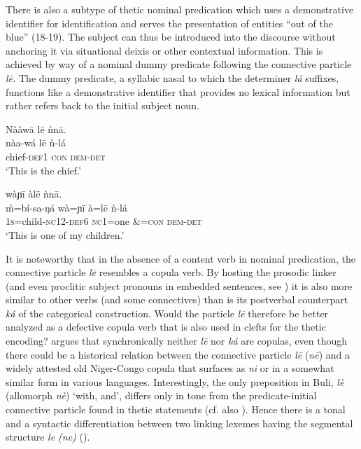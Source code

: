 \documentclass[output=paper]{langsci/langscibook}
\begin{document}
There is also a subtype of thetic nominal predication which uses a demonstrative identifier for identification and serves the presentation of entities “out of the blue” (18-19). The subject can thus be introduced into the discourse without anchoring it via situational deixis or other contextual information. This is achieved by way of a nominal dummy predicate following the connective particle \textit{l\={e}.} The dummy predicate, a syllabic nasal to which the determiner \textit{lá} suffixes, functions like a demonstrative identifier that provides no lexical information but rather refers back to the initial subject noun.

\ea\label{ex:schwarz:18}
\glll   Nààw\={a}    l\={e}  ǹn\={a}.\\
    \textup{nàa-wá}    l\={e}  {ǹ-lá}\\
       chief-\textsc{def1}  \textsc{con}  \textsc{dem}-\textsc{det}\\
\glt ‘This is the chief.’
\z

\ea\label{ex:schwarz:19}
    wàɲ\={i}    àl\={e}    ǹn\={a}.\\
    \textup{\`{m}=bí-sa-ŋá}    wà=ɲ\={i}    à=l\={e}    {ǹ-lá}\\
       1\textsc{s}=child-\textsc{nc}12-\textsc{def}6  \textsc{nc}1=one  \&=\textsc{con}  \textsc{dem-det}\\
\glt ‘This is one of my children.’
\z

It is noteworthy that in the absence of a content verb in nominal predication, the connective particle \textit{l\={e}} resembles a copula verb. By hosting the prosodic linker (and even proclitic subject pronouns in embedded sentences, see ) it is also more similar to other verbs (and some connectives) than is its postverbal counterpart \textit{ká} of the categorical construction. Would the particle \textit{l\={e}} therefore be better analyzed as a defective copula verb that is also used in clefts for the thetic encoding? \citet{Schwarz2009} argues that synchronically neither \textit{l\={e}} nor \textit{ká} are copulas, even though there could be a historical relation between the connective particle \textit{l\={e}} (\textit{n\={e}}) and a widely attested old Niger-Congo copula that surfaces as \textit{ni} or in a somewhat similar form in various languages. Interestingly, the only preposition in Buli, \textit{lè} (allomorph \textit{nè}) ‘with, and’, differs only in tone from the predicate-initial connective particle found in thetic statements (cf. also \citealt{Schwarz2010a}). Hence there is a tonal and a syntactic differentiation between two linking lexemes having the segmental structure \textit{le (ne)} ().
\end{document}

